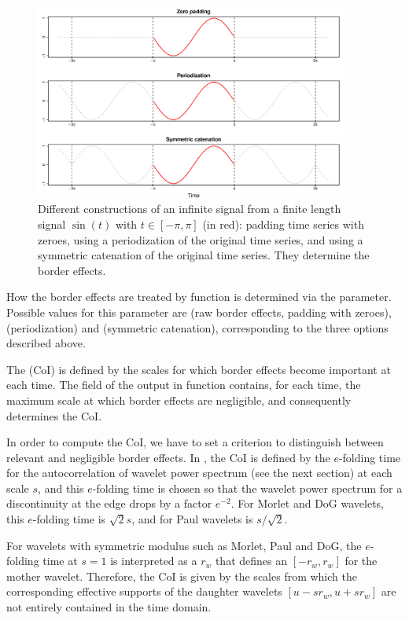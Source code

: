 \begin{figure}[tbp]
\begin{center}
  \includegraphics[width=0.92\textwidth]{Figure2}
\end{center}
\caption{Different constructions of an infinite signal from a finite length signal $\sin (t)$ with $t\in \left[-\pi ,\pi\right] $ (in red): padding time series with zeroes, using a periodization of the original time series, and using a symmetric catenation of the original time series. They determine the border effects.}
\label{fig:be}
\end{figure}

How the border effects are treated by function  is determined via the  parameter. Possible values for this parameter are  (raw border effects, padding with zeroes),  (periodization) and  (symmetric catenation), corresponding to the three options described above.

\begin{rmk}
\label{rem:coi}
The  (CoI) is defined by the scales for which border effects become important at each time. The field  of the output in  function contains, for each time, the maximum scale at which border effects are negligible, and consequently determines the CoI.

In order to compute the CoI, we have to set a criterion to distinguish between relevant and negligible border effects. In \citet{tor98}, the CoI is defined by the $e$-folding time for the autocorrelation of wavelet power spectrum (see the next section) at each scale $s$, and this $e$-folding time is chosen so that the wavelet power spectrum for a discontinuity at the edge drops by a factor $e^{-2}$. For Morlet and DoG wavelets, this $e$-folding time is $\sqrt{2}s$, and for Paul wavelets is $s/\sqrt{2}$.

For wavelets with symmetric modulus such as  Morlet, Paul and DoG, the $e$-folding time at $s=1$ is interpreted as a  $r_w$ that defines an  $\left[ -r_w,r_w\right] $ for the mother wavelet. Therefore, the CoI is given by the scales from which the corresponding effective supports of the daughter wavelets $\left[ u-sr_w,u+sr_w\right] $ are not entirely contained in the time domain.
\end{rmk}

